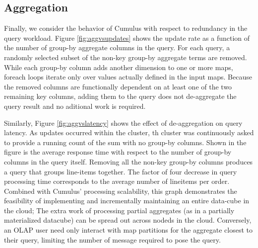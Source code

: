 \subsection{Aggregation}
Finally, we consider the behavior of Cumulus with respect to redundancy in the query workload.  Figure \ref{fig:aggvsupdates} shows the update rate as a function of the number of group-by aggregate columns in the query.  For each query, a randomly selected subset of the non-key group-by aggregate terms are removed.  While each group-by column adds another dimension to one or more maps, foreach loops iterate only over values actually defined in the input maps.  Because the removed columns are functionally dependent on at least one of the two remaining key columns, adding them to the query does not de-aggregate the query result and no aditional work is required.

Similarly, Figure \ref{fig:aggvslatency} shows the effect of de-aggregation on query latency.  As updates occurred within the cluster, th cluster was continuously asked to provide a running count of the sum with no group-by columns.  Shown in the figure is the average response time with respect to the number of group-by columns in the query itself.  Removing all the non-key group-by columns produces a query that groups line-items together.  The factor of four decrease in query processing time corresponds to the average number of lineitems per order.  Combined with Cumulus' processing scalability, this graph demonstrates the feasibility of implementing and incrementally maintaining an entire data-cube in the cloud; The extra work of processing partial aggregates (as in a partially materialized datacube) can be spread out across nodeds in the cloud.  Conversely, an OLAP user need only interact with map partitions for the aggregate closest to their query, limiting the number of message required to pose the query.

